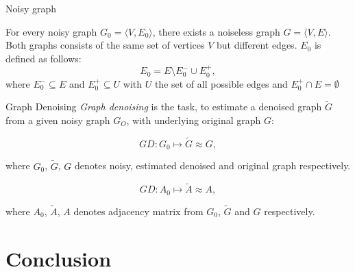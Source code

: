 \documentclass[aspectratio=169]{beamer}
\begin{document}
\begin{frame}[c]{Noisy graph}

    \begin{theorem}
        For every noisy graph $G_0 = \langle V, E_0 \rangle$, 
        there exists a noiseless graph $G = \langle V, E \rangle$.
        Both graphs consists of the same set of vertices $V$ but different edges.
        $E_0$  is defined as follows:
        $$E_0 = E \setminus  E^{-}_0 \cup  E^{+}_0,$$
        where $E^{-}_0 \subseteq E$ and $E^{+}_0 \subseteq U$ with $U$ the set of all possible edges and $E^{+}_0 \cap E = \emptyset$
    \end{theorem}

\end{frame}

\begin{frame}[c]{Graph Denoising}
    \textit{Graph denoising} is the task, to estimate a denoised graph $\tilde{G}$  
    from a given noisy graph $G_O$, with underlying original graph $G$:

    \begin{definition}
        $$GD: G_0 \mapsto \tilde{G} \approx G,$$
    \end{definition}
    where $G_0$, $\tilde{G}$, $G$ denotes noisy, estimated denoised and original graph respectively.
    
    \begin{definition}
        $$GD: A_0 \mapsto \tilde{A} \approx A,$$
    \end{definition}
    where $A_0$, $\tilde{A}$, $A$ denotes adjacency matrix from $G_0$, $\tilde{G}$ and $G$ respectively.

\end{frame}

\section{Conclusion}
\end{document}
